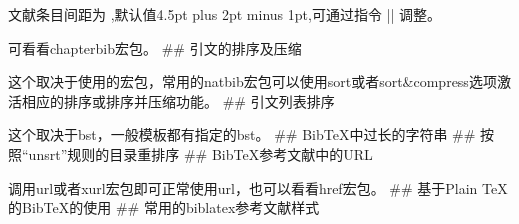 
文献条目间距为 ,默认值4.5pt plus 2pt minus
1pt,可通过指令 |\addtolength{\itemsep}{距离}| 调整。



可看看chapterbib宏包。 \#\# 引文的排序及压缩

这个取决于使用的宏包，常用的natbib宏包可以使用sort或者sort\&compress选项激活相应的排序或排序并压缩功能。
\#\# 引文列表排序

这个取决于bst，一般模板都有指定的bst。 \#\# BibTeX中过长的字符串 \#\#
按照``unsrt''规则的目录重排序 \#\# BibTeX参考文献中的URL

调用url或者xurl宏包即可正常使用url，也可以看看href宏包。 \#\# 基于Plain
TeX的BibTeX的使用 \#\# 常用的biblatex参考文献样式

